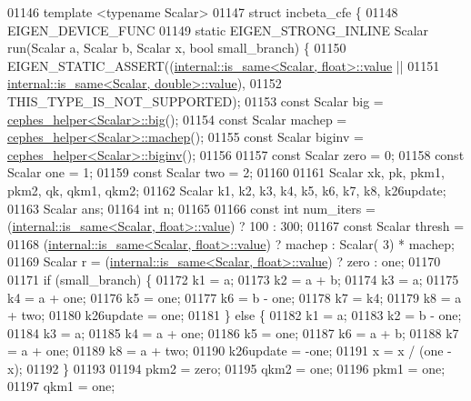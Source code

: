 \begin{DoxyCode}
01146 \textcolor{keyword}{template} <\textcolor{keyword}{typename} Scalar>
01147 \textcolor{keyword}{struct }incbeta\_cfe \{
01148   EIGEN\_DEVICE\_FUNC
01149   \textcolor{keyword}{static} EIGEN\_STRONG\_INLINE Scalar run(Scalar a, Scalar b, Scalar x, \textcolor{keywordtype}{bool} small\_branch) \{
01150     EIGEN\_STATIC\_ASSERT((\hyperlink{struct_eigen_1_1internal_1_1is__same}{internal::is\_same<Scalar, float>::value} ||
01151                          \hyperlink{struct_eigen_1_1internal_1_1is__same}{internal::is\_same<Scalar, double>::value}),
01152                         THIS\_TYPE\_IS\_NOT\_SUPPORTED);
01153     \textcolor{keyword}{const} Scalar big = \hyperlink{struct_eigen_1_1internal_1_1cephes__helper}{cephes\_helper<Scalar>::big}();
01154     \textcolor{keyword}{const} Scalar machep = \hyperlink{struct_eigen_1_1internal_1_1cephes__helper}{cephes\_helper<Scalar>::machep}();
01155     \textcolor{keyword}{const} Scalar biginv = \hyperlink{struct_eigen_1_1internal_1_1cephes__helper}{cephes\_helper<Scalar>::biginv}();
01156 
01157     \textcolor{keyword}{const} Scalar zero = 0;
01158     \textcolor{keyword}{const} Scalar one = 1;
01159     \textcolor{keyword}{const} Scalar two = 2;
01160 
01161     Scalar xk, pk, pkm1, pkm2, qk, qkm1, qkm2;
01162     Scalar k1, k2, k3, k4, k5, k6, k7, k8, k26update;
01163     Scalar ans;
01164     \textcolor{keywordtype}{int} n;
01165 
01166     \textcolor{keyword}{const} \textcolor{keywordtype}{int} num\_iters = (\hyperlink{struct_eigen_1_1internal_1_1is__same}{internal::is\_same<Scalar, float>::value}) 
      ? 100 : 300;
01167     \textcolor{keyword}{const} Scalar thresh =
01168         (\hyperlink{struct_eigen_1_1internal_1_1is__same}{internal::is\_same<Scalar, float>::value}) ? machep : Scalar(
      3) * machep;
01169     Scalar r = (\hyperlink{struct_eigen_1_1internal_1_1is__same}{internal::is\_same<Scalar, float>::value}) ? zero : 
      one;
01170 
01171     \textcolor{keywordflow}{if} (small\_branch) \{
01172       k1 = a;
01173       k2 = a + b;
01174       k3 = a;
01175       k4 = a + one;
01176       k5 = one;
01177       k6 = b - one;
01178       k7 = k4;
01179       k8 = a + two;
01180       k26update = one;
01181     \} \textcolor{keywordflow}{else} \{
01182       k1 = a;
01183       k2 = b - one;
01184       k3 = a;
01185       k4 = a + one;
01186       k5 = one;
01187       k6 = a + b;
01188       k7 = a + one;
01189       k8 = a + two;
01190       k26update = -one;
01191       x = x / (one - x);
01192     \}
01193 
01194     pkm2 = zero;
01195     qkm2 = one;
01196     pkm1 = one;
01197     qkm1 = one;

\end{DoxyCode}
